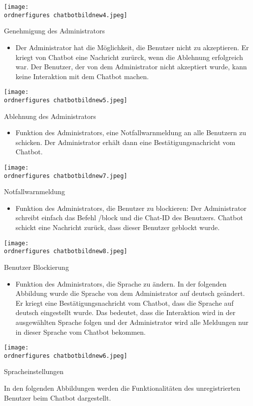 \captionsetup{type=figure}
\texttt{[image: \\ordnerfigures chatbotbildnew4.jpeg]}
\caption{Genehmigung des Administrators}
\label{chatbotbenjdf}
\begin{itemize}
	\item Der Administrator hat die M\"oglichkeit, die Benutzer nicht zu akzeptieren. Er kriegt von Chatbot eine Nachricht zur\"urck, wenn die Ablehnung erfolgreich war. Der Benutzer, der von dem Administrator nicht akzeptiert wurde, kann keine Interaktion mit dem Chatbot machen.
\end{itemize}
\captionsetup{type=figure}
\texttt{[image: \\ordnerfigures chatbotbildnew5.jpeg]}
\caption{Ablehnung des Administrators}
\label{chatbotbenjjdf}
\newpage
\begin{itemize}
	\item Funktion des Administrators, eine Notfallwarnmeldung an alle Benutzern zu schicken. Der Administrator erhält dann eine Bestätigungsnachricht vom Chatbot.
\end{itemize}
\captionsetup{type=figure}
\texttt{[image: \\ordnerfigures chatbotbildnew7.jpeg]}
\caption{Notfallwarnmeldung}
\label{chatbfotbenjjdf}
\begin{itemize}
	\item Funktion des Administrators, die Benutzer zu blockieren: Der Administrator schreibt einfach das Befehl /block und die Chat-ID des Benutzers. Chatbot schickt eine Nachricht zurück, dass dieser Benutzer geblockt wurde.
\end{itemize}
\captionsetup{type=figure}
\texttt{[image: \\ordnerfigures chatbotbildnew8.jpeg]}
\caption{Benutzer Blockierung}
\label{fig:chatbotblock} 
\captionsetup{type=figure} 
\begin{itemize}
	\item Funktion des Administrators, die Sprache zu \"andern. In der folgenden Abbildung wurde die Sprache von dem Administrator auf deutsch ge\"andert. Er kriegt eine Best\"atigungsnachricht vom Chatbot, dass die Sprache auf deutsch eingestellt wurde. Das bedeutet, dass die Interaktion wird in der ausgew\"ahlten Sprache folgen und der Administrator wird alle Meldungen nur in dieser Sprache vom Chatbot bekommen.
\end{itemize}
\captionsetup{type=figure}
\texttt{[image: \\ordnerfigures chatbotbildnew6.jpeg]}
\caption{Spracheinstellungen}
\label{fig:sprachek} 
\captionsetup{type=figure} 
\newpage
In den folgenden Abbildungen werden die Funktionalitäten des unregistrierten Benutzer beim Chatbot dargestellt.
